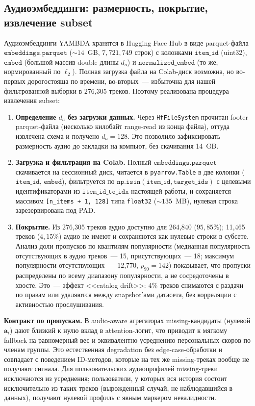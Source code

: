\subsection{Аудиоэмбеддинги: размерность, покрытие, извлечение subset}\label{subsec:ch3:audio}

Аудиоэмбеддинги YAMBDA хранятся в Hugging Face Hub в виде parquet-файла $\texttt{embeddings.parquet}$ ($\sim\!14$~GB, $7{,}721{,}749$ строк) с колонками $\mathtt{item\_id}$ (uint32), $\mathtt{embed}$ (большой массив double длины $d_a$) и $\mathtt{normalized\_embed}$ (то же, нормированный по $\ell_2$). Полная загрузка файла на Colab-диск возможна, но во-первых дорогостояща по времени, во-вторых~--- избыточна для нашей фильтрованной выборки в 276{,}305 треков. Поэтому реализована процедура извлечения subset:

\begin{enumerate}
    \item \textbf{Определение $d_a$ без загрузки данных.} Через \texttt{HfFileSystem} прочитан footer parquet-файла (несколько килобайт range-read из конца файла), оттуда извлечена схема и получено $d_a = 128$. Это позволило зафиксировать размерность аудио до закладки на компьют, без скачивания 14~GB.
    \item \textbf{Загрузка и фильтрация на Colab.} Полный $\texttt{embeddings.parquet}$ скачивается на сессионный диск, читается в \texttt{pyarrow.Table} в две колонки ($\mathtt{item\_id}$, $\mathtt{embed}$), фильтруется по $\mathtt{np.isin}(\mathtt{item\_id}, \mathtt{target\_ids})$ с целевыми идентификаторами из $\mathtt{item\_id\_to\_idx}$ настоящей работы, и сохраняется массивом \texttt{[n\_items + 1, 128]} типа \texttt{float32} ($\sim\!135$~MB), нулевая строка зарезервирована под PAD.
    \item \textbf{Покрытие.} Из 276{,}305 треков аудио доступно для 264{,}840 ($95{,}85\%$); 11{,}465 треков ($4{,}15\%$) аудио не имеют и сохраняются как нулевые строки в субсете. Анализ доли пропусков по квантилям популярности (медианная популярность отсутствующих в аудио треков~--- 15, присутствующих~--- 18; максимум популярности отсутствующих~--- 12{,}770, $p_{90} = 142$) показывает, что пропуски распределены по всему диапазону популярности, а не сосредоточены в хвосте. Это~--- эффект <<catalog drift>>: 4\% треков снимаются с раздачи по правам или удаляются между snapshot'ами датасета, без корреляции с активностью прослушивания.
\end{enumerate}

\textbf{Контракт по пропускам.} В audio-aware агрегаторах missing-кандидаты (нулевой $\mathbf{a}_i$) дают близкий к нулю вклад в attention-логит, что приводит к мягкому fallback на равномерный вес и эквивалентно усреднению персональных скоров по членам группы. Это естественная degradation без edge-case-обработки и совпадает с поведением ID-методов, которые на тех же missing-треках вообще не получают сигнала. Для пользовательских аудиопрофилей missing-треки исключаются из усреднения; пользователи, у которых вся история состоит исключительно из таких треков (вырожденный случай, не наблюдавшийся в данных), получают нулевой профиль с явным маркером невалидности.

